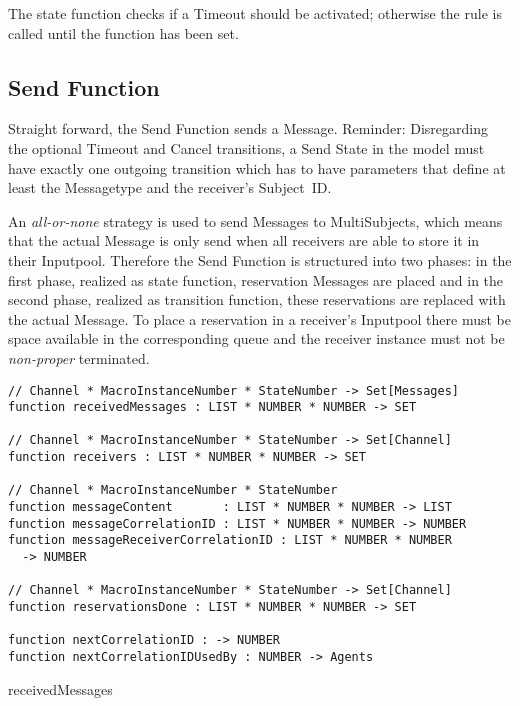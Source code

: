 The state function checks if a Timeout should be activated; otherwise the
 rule is called until the  function has
been set.



\subsection{Send Function}


Straight forward, the Send Function sends a Message. Reminder: Disregarding the optional Timeout and Cancel transitions, a Send State in the model must have exactly one outgoing transition which has to have parameters that define at least the Messagetype and the receiver's Subject~ID.

An \textit{all-or-none} strategy is used to send Messages to MultiSubjects, which means that the actual Message is only send when all receivers are able to store it in their Inputpool. Therefore the Send Function is structured into two phases: in the first phase, realized as state function, reservation Messages are placed and in the second phase, realized as transition function, these reservations are replaced with the actual Message. To place a reservation in a receiver's Inputpool there must be space available in the corresponding queue and the receiver instance must not be \textit{non-proper} terminated.


\begin{listing}[htbp]
\begin{verbatim}
// Channel * MacroInstanceNumber * StateNumber -> Set[Messages]
function receivedMessages : LIST * NUMBER * NUMBER -> SET

// Channel * MacroInstanceNumber * StateNumber -> Set[Channel]
function receivers : LIST * NUMBER * NUMBER -> SET

// Channel * MacroInstanceNumber * StateNumber
function messageContent       : LIST * NUMBER * NUMBER -> LIST
function messageCorrelationID : LIST * NUMBER * NUMBER -> NUMBER
function messageReceiverCorrelationID : LIST * NUMBER * NUMBER
  -> NUMBER

// Channel * MacroInstanceNumber * StateNumber -> Set[Channel]
function reservationsDone : LIST * NUMBER * NUMBER -> SET

function nextCorrelationID : -> NUMBER
function nextCorrelationIDUsedBy : NUMBER -> Agents
\end{verbatim}
\caption{receivedMessages}
\label{lst:shortasm:receivedMessages}
\end{listing}


